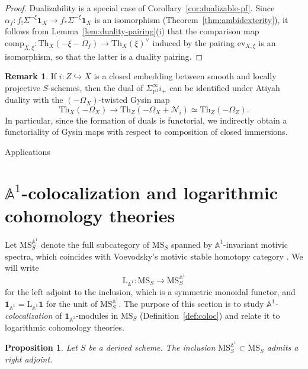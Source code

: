 \documentclass{amsart}
\makeatletter
\def\new@part{\@startsection{part}{0}%
  \z@{\linespacing\@plus\linespacing}{.5\linespacing}%
  {\normalfont\large\bfseries\raggedright}}
\def\part#1{%
{\def\@secnumfont{\bfseries}%
\new@part{#1}%
}}
\numberwithin{equation}{section}
\theoremstyle{plain}
\newtheorem{proposition}[equation]{Proposition}
\theoremstyle{definition}
\newtheorem{remark}[equation]{Remark}
\let\scr=\mathcal
\let\bb=\mathbb
\let\rm=\mathrm
\def\A{\bb A}
\def\P{\bb P}
\def\1{\mathbf 1}
\let\into=\hookrightarrow
\def\Th{\mathrm{Th}}
\def\MS{\mathrm{MS}}
\def\ev{\mathrm{ev}}
\makeatother
\begin{document}
\begin{proof}
	Dualizability is a special case of Corollary~\ref{cor:dualizable-pf}. Since $\alpha_f\colon f_!\Sigma^{-\xi}\1_X\to f_*\Sigma^{-\xi}\1_X$ is an isomorphism (Theorem~\ref{thm:ambidexterity}), it follows from Lemma~\ref{lem:duality-pairing}(i) that the comparison map $\mathrm{comp}_{X,\xi}\colon \Th_X(-\xi-\Omega_f)\to \Th_X(\xi)^\vee$ induced by the pairing $\ev_{X,\xi}$ is an isomorphism, so that the latter is a duality pairing.
\end{proof}

\begin{remark}
	If $i\colon Z\into X$ is a closed embedding between smooth and locally projective $S$-schemes, then the dual of $\Sigma^\infty_{\P^1} i_+$ can be identified under Atiyah duality with the $(-\Omega_X)$-twisted Gysin map
	\[
	\Th_X(-\Omega_X) \to \Th_Z(-\Omega_X+\scr N_{i}) \simeq \Th_Z(-\Omega_Z).
	\]
	In particular, since the formation of duals is functorial, we indirectly obtain a functoriality of Gysin maps with respect to composition of closed immersions. %
\end{remark}

\part{Applications}

\section{$\A^1$-colocalization and logarithmic cohomology theories}
\label{sec:logarithmic}

Let $\MS_S^{\A^1}$ denote the full subcategory of $\MS_S$ spanned by $\A^1$-invariant motivic spectra, which coincides with Voevodsky's motivic stable homotopy category \cite{VoevodskyICM}. 
We will write \[\rm L_{\A^1}\colon \MS_S\to\MS_S^{\A^1}\] for the left adjoint to the inclusion, which is a symmetric monoidal functor, and $\1_{\A^1}=\rm L_{\A^1}\1$ for the unit of $\MS_S^{\A^1}$. %
The purpose of this section is to study \textit{$\A^1$-colocalization} of $\1_{\A^1}$-modules in $\MS_S$ (Definition~\ref{def:coloc}) and relate it to logarithmic cohomology theories.

\begin{proposition}\label{prop:A1-colocalization}
	Let $S$ be a derived scheme. The inclusion $\MS^{\A^1}_S\subset\MS_S$ admits a right adjoint.
\end{proposition}
\end{document}
